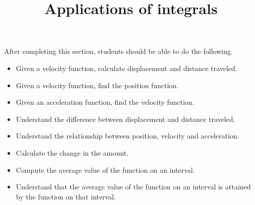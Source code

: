\documentclass{ximera}
\title{Applications of integrals}
\begin{document}
\begin{abstract}
\end{abstract}

\maketitle

\begin{sectionOutcomes}

After completing this section, students should be able to do the following.

\begin{itemize}
	\item Given a velocity function, calculate displacement and distance traveled.
	\item Given a velocity function, find the position function.
	\item Given an acceleration function, find the velocity function.
	\item Understand the difference between displacement and distance traveled.
	\item Understand the relationship between position, velocity and acceleration.
	\item Calculate the change in the amount.
	\item Compute the average value of the function on an interval.
	\item Understand that the average value of the function on an interval is attained by the function on that interval.

\end{itemize}

\end{sectionOutcomes}
\end{document}
